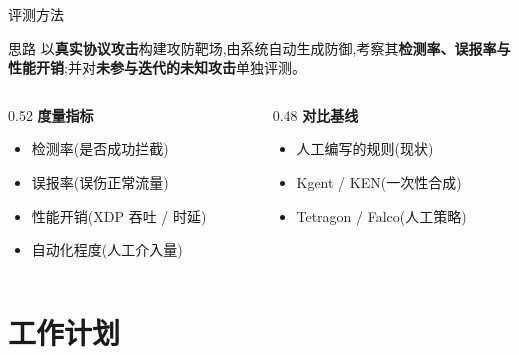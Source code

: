 \documentclass[aspectratio=169,10pt]{beamer}
\begin{document}
\begin{frame}{评测方法}
    \begin{block}{思路}
        以\textbf{真实协议攻击}构建攻防靶场,由系统自动生成防御,考察其\textbf{检测率、误报率与性能开销};并对\textbf{未参与迭代的未知攻击}单独评测。
    \end{block}
    \begin{columns}[T]
        \begin{column}{0.52\textwidth}
            \textbf{度量指标}
            \begin{itemize}
                \item 检测率(是否成功拦截)
                \item 误报率(误伤正常流量)
                \item 性能开销(XDP 吞吐 / 时延)
                \item 自动化程度(人工介入量)
            \end{itemize}
        \end{column}
        \begin{column}{0.48\textwidth}
            \textbf{对比基线}
            \begin{itemize}
                \item 人工编写的规则(现状)
                \item Kgent / KEN(一次性合成)
                \item Tetragon / Falco(人工策略)
            \end{itemize}
        \end{column}
    \end{columns}
\end{frame}


\section{工作计划}
\end{document}
